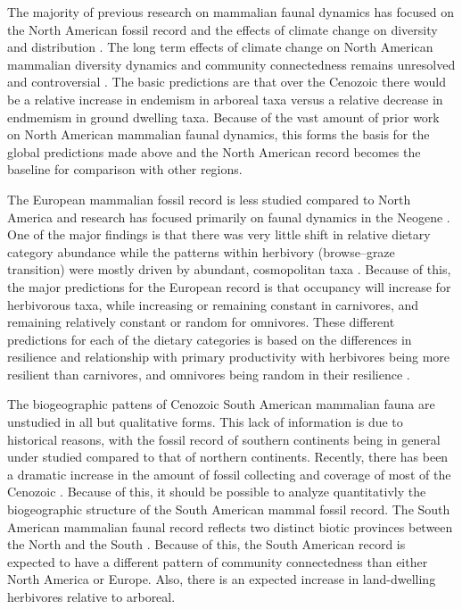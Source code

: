\documentclass[12pt,letterpaper]{article}
\begin{document}
The majority of previous research on mammalian faunal dynamics has focused on the North American fossil record and the effects of climate change on diversity and distribution \citep{Alroy2000g,Alroy1996a,Alroy1998,Barnosky2001a,Simpson1944,Simpson1953,Badgley2013,Blois2009,Figueirido2012,Gunnell1995,Hadly2001}. The long term effects of climate change on North American mammalian diversity dynamics and community connectedness remains unresolved and controversial \citep{Alroy2000g,Blois2009,Figueirido2012,Barnosky2001a}. The basic predictions are that over the Cenozoic there would be a relative increase in endemism in arboreal taxa versus a relative decrease in endmemism in ground dwelling taxa. Because of the vast amount of prior work on North American mammalian faunal dynamics, this forms the basis for the global predictions made above and the North American record becomes the baseline for comparison with other regions.

The European mammalian fossil record is less studied compared to North America and research has focused primarily on faunal dynamics in the Neogene \citep{Jernvall2002,Jernvall2004,Liow2008,Raia2006,Raia2005,Raia2011c}. One of the major findings is that there was very little shift in relative dietary category abundance \citep{Jernvall2004} while the patterns within herbivory (browse--graze transition) were mostly driven by abundant, cosmopolitan taxa \citep{Jernvall2002}. Because of this, the major predictions for the European record is that occupancy will increase for herbivorous taxa, while increasing or remaining constant in carnivores, and remaining relatively constant or random for omnivores. These different predictions for each of the dietary categories is based on the differences in resilience and relationship with primary productivity with herbivores being more resilient than carnivores, and omnivores being random in their resilience \citep{Jernvall2004}. 

The biogeographic pattens of Cenozoic South American mammalian fauna are unstudied in all but qualitative forms. This lack of information is due to historical reasons, with the fossil record of southern continents being in general under studied compared to that of northern continents. Recently, there has been a dramatic increase in the amount of fossil collecting and coverage of most of the Cenozoic \citep{Macfadden1997,Macfadden2006,Flynn1998a}. Because of this, it should be possible to analyze quantitativly the biogeographic structure of the South American mammal fossil record. The South American mammalian faunal record reflects two distinct biotic provinces between the North and the South \citep{Macfadden1997,Macfadden2006,Flynn1998a,Patterson1968}. Because of this, the South American record is expected to have a different pattern of community connectedness than either North America or Europe. Also, there is an expected increase in land-dwelling herbivores relative to arboreal.
\end{document}
